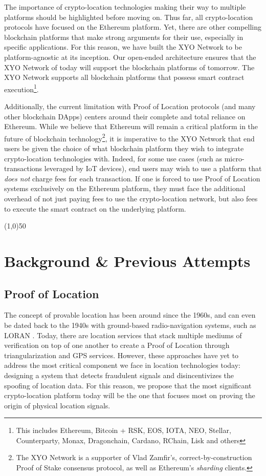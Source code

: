 \documentclass{article}
\begin{document}
The importance of crypto-location technologies making their way to multiple platforms should be highlighted before moving on. Thus far, all crypto-location protocols have focused on the Ethereum platform. Yet, there are other compelling blockchain platforms that make strong arguments for their use, especially in specific applications. For this reason, we have built the XYO Network to be platform-agnostic at its inception. Our open-ended architecture ensures that the XYO Network of today will support the blockchain platforms of tomorrow. The XYO Network supports all blockchain platforms that possess smart contract execution\footnote{This includes Ethereum, Bitcoin + RSK, EOS, IOTA, NEO, Stellar, Counterparty, Monax, Dragonchain, Cardano, RChain, Lisk and others}.

Additionally, the current limitation with Proof of Location protocols (and many other blockchain DApps) centers around their complete and total reliance on Ethereum. While we believe that Ethereum will remain a critical platform in the future of blockchain technology\footnote{The XYO Network is a supporter of Vlad Zamfir's, correct-by-construction Proof of Stake consensus protocol, as well as Ethereum's \textit{sharding} clients.}, it is imperative to the XYO Network that end users be given the choice of what blockchain platform they wish to integrate crypto-location technologies with. Indeed, for some use cases (such as micro-transactions leveraged by IoT devices), end users may wish to use a platform that \textit{does not} charge fees for each transaction. If one is forced to use Proof of Location systems exclusively on the Ethereum platform, they must face the additional overhead of not just paying fees to use the crypto-location network, but also fees to execute the smart contract on the underlying platform.

\clearpage

\begin{center}
\line(1,0){50}
\end{center}

\section{Background \& Previous Attempts}

\subsection{Proof of Location}

The concept of provable location has been around since the 1960s, and can even be dated back to the 1940s with ground-based radio-navigation systems, such as LORAN \cite{blanchard-loran}. Today, there are location services that stack multiple mediums of verification on top of one another to create a Proof of Location through triangularization and GPS services. However, these approaches have yet to address the most critical component we face in location technologies today: designing a system that detects fraudulent signals and disincentivizes the spoofing of location data. For this reason, we propose that the most significant crypto-location platform today will be the one that focuses most on proving the origin of physical location signals.
\end{document}
